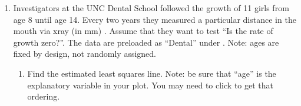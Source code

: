 \begin{enumerate}
\begin{students}
\newpage
\end{students}





\item Investigators at the UNC Dental School followed the growth of 11
  girls from age 8 until age 14.  Every two years they measured a
  particular distance in the mouth via xray (in mm) .  Assume that
  they want to test ``Is the rate of growth zero?''.  The data are
  preloaded as ``Dental'' under .  Note: ages are fixed by
  design, not randomly assigned.
     \begin{enumerate}
     \item Find the estimated least squares line.  Note: be sure that
       ``age'' is the explanatory variable in your plot. You may need
       to click  to get that ordering.
\begin{students}
  \vspace{1.5cm}
\end{students} 


\end{enumerate}
\end{enumerate}
